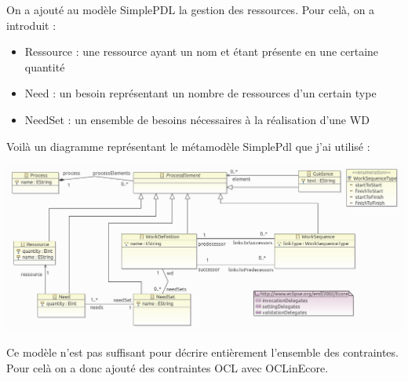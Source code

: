 On a ajouté au modèle SimplePDL la gestion des ressources.
Pour celà, on a introduit :
\begin{itemize}
\item Ressource : une ressource ayant un nom et étant présente en une certaine quantité
\item Need : un besoin représentant un nombre de ressources d'un certain type
\item NeedSet : un ensemble de besoins nécessaires à la réalisation d'une WD
\end{itemize}

\vspace{1em}
Voilà un diagramme représentant le métamodèle SimplePdl que j'ai utilisé :
\begin{center}
\includegraphics[width=\textwidth]{../Images/meta_pdl.png}
\end{center}

\newpage
Ce modèle n'est pas suffisant pour décrire entièrement l'ensemble des contraintes. Pour celà on a donc ajouté des contraintes OCL avec OCLinEcore.\\

